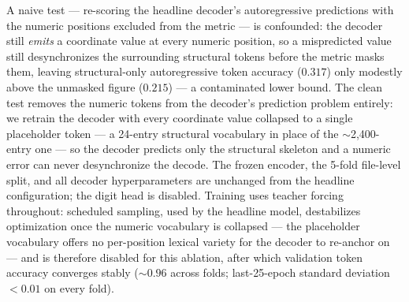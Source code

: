 A naive test --- re-scoring the headline decoder's autoregressive predictions
with the numeric positions excluded from the metric --- is confounded: the
decoder still \emph{emits} a coordinate value at every numeric position, so a
mispredicted value still desynchronizes the surrounding structural tokens
before the metric masks them, leaving structural-only autoregressive token
accuracy ($0.317$) only modestly above the unmasked figure ($0.215$) --- a
contaminated lower bound. The clean test removes the numeric tokens from the
decoder's prediction problem entirely: we retrain the decoder with every
coordinate value collapsed to a single placeholder token --- a 24-entry
structural vocabulary in place of the $\sim$2{,}400-entry one --- so the
decoder predicts only the structural skeleton and a numeric error can never
desynchronize the decode. The frozen encoder, the 5-fold file-level split,
and all decoder hyperparameters are unchanged from the headline configuration;
the digit head is disabled. Training uses teacher forcing throughout:
scheduled sampling, used by the headline model, destabilizes optimization
once the numeric vocabulary is collapsed --- the placeholder vocabulary
offers no per-position lexical variety for the decoder to re-anchor on ---
and is therefore disabled for this ablation, after which validation token
accuracy converges stably ($\sim$$0.96$ across folds; last-25-epoch standard
deviation $<\!0.01$ on every fold).

